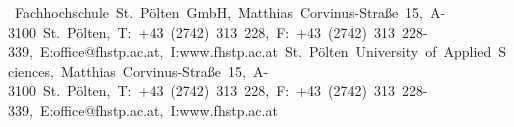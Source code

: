 {\begin{titlepage}
{\vspace{.5cm}

\enlargethispage{3\baselineskip}

\vfill


{\centering
	\sffamily\tiny{\mbox{%
		\ifisGerman
		Fachhochschule St. P\"olten GmbH,  Matthias Corvinus-Stra\ss{}e 15, A-3100 St. P\"olten,%
		T: +43 (2742) 313 228, F: +43 (2742) 313 228-339, E:office@fhstp.ac.at, I:www.fhstp.ac.at%
		\else
		St. P\"olten University of Applied Sciences,  Matthias Corvinus-Stra\ss{}e 15, A-3100 St. P\"olten,%
		T: +43 (2742) 313 228, F: +43 (2742) 313 228-339, E:office@fhstp.ac.at, I:www.fhstp.ac.at%
		\fi
	}}
}


}
\end{titlepage}
}

\makeatother

